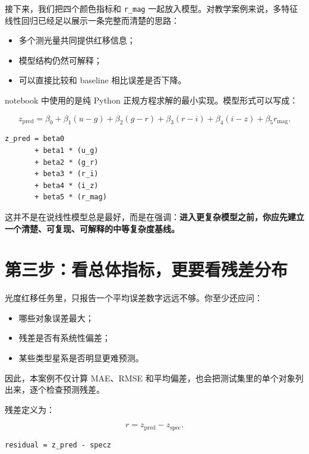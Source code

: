 接下来，我们把四个颜色指标和 \texttt{r\_mag} 一起放入模型。对教学案例来说，多特征线性回归已经足以展示一条完整而清楚的思路：

\begin{itemize}
    \item 多个测光量共同提供红移信息；
    \item 模型结构仍然可解释；
    \item 可以直接比较和 baseline 相比误差是否下降。
\end{itemize}

notebook 中使用的是纯 Python 正规方程求解的最小实现。模型形式可以写成：

\[
z_{\mathrm{pred}} =
\beta_0
+ \beta_1 (u-g)
+ \beta_2 (g-r)
+ \beta_3 (r-i)
+ \beta_4 (i-z)
+ \beta_5 r_{\mathrm{mag}}.
\]

\begin{examplebox}[多特征线性模型]
\begin{lstlisting}[style=pythonstyle]
z_pred = beta0
       + beta1 * (u_g)
       + beta2 * (g_r)
       + beta3 * (r_i)
       + beta4 * (i_z)
       + beta5 * (r_mag)
\end{lstlisting}
\end{examplebox}

这并不是在说线性模型总是最好，而是在强调：\textbf{进入更复杂模型之前，你应先建立一个清楚、可复现、可解释的中等复杂度基线。}

\section{第三步：看总体指标，更要看残差分布}

光度红移任务里，只报告一个平均误差数字远远不够。你至少还应问：

\begin{itemize}
    \item 哪些对象误差最大；
    \item 残差是否有系统性偏差；
    \item 某些类型星系是否明显更难预测。
\end{itemize}

因此，本案例不仅计算 MAE、RMSE 和平均偏差，也会把测试集里的单个对象列出来，逐个检查预测残差。

残差定义为：

\[
r = z_{\mathrm{pred}} - z_{\mathrm{spec}}.
\]

\begin{examplebox}[残差定义]
\begin{lstlisting}[style=pythonstyle]
residual = z_pred - specz
\end{lstlisting}
\end{examplebox}

